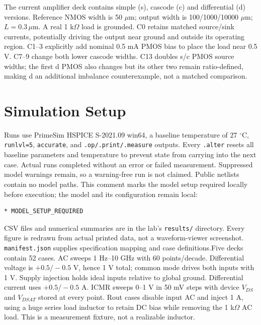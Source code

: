 The current amplifier deck contains simple (s), cascode (c) and differential (d) versions. Reference NMOS width is 50 $\mu$m; output width is 100/1000/10000 $\mu$m; $L=0.3\,\mu$m. A real 1 k$\Omega$ load is grounded. C0 retains matched source/sink currents, potentially driving the output near ground and outside its operating region. C1--3 explicitly add nominal 0.5 mA PMOS bias to place the load near 0.5 V. C7--9 change both lower cascode widths. C13 doubles s/c PMOS source widths; the first d PMOS also changes but its other two remain ratio-defined, making d an additional imbalance counterexample, not a matched comparison.

\section{Simulation Setup}
Runs use PrimeSim HSPICE S-2021.09 win64, a baseline temperature of 27 $^\circ$C, \texttt{runlvl=5}, \texttt{accurate}, and \texttt{.op/.print/.measure} outputs. Every \texttt{.alter} resets all baseline parameters and temperature to prevent state from carrying into the next case. Actual runs completed without an error or failed measurement. Suppressed model warnings remain, so a warning-free run is not claimed. Public netlists contain no model paths. This comment marks the model setup required locally before execution; the model and its configuration remain local:
\begin{verbatim}
* MODEL_SETUP_REQUIRED
\end{verbatim}
CSV files and numerical summaries are in the lab's \texttt{results/} directory. Every figure is redrawn from actual printed data, not a waveform-viewer screenshot. \texttt{manifest.json} supplies specification mapping and case definitions.Five decks contain 52 cases. AC sweeps 1 Hz--10 GHz with 60 points/decade. Differential voltage is $+0.5/-0.5$ V, hence 1 V total; common mode drives both inputs with 1 V. Supply injection holds ideal inputs relative to global ground. Differential current uses $+0.5/-0.5$ A. ICMR sweeps 0--1 V in 50 mV steps with device $V_{DS}$ and $V_{DSAT}$ stored at every point. Rout cases disable input AC and inject 1 A, using a huge series load inductor to retain DC bias while removing the 1 k$\Omega$ AC load. This is a measurement fixture, not a realizable inductor.

